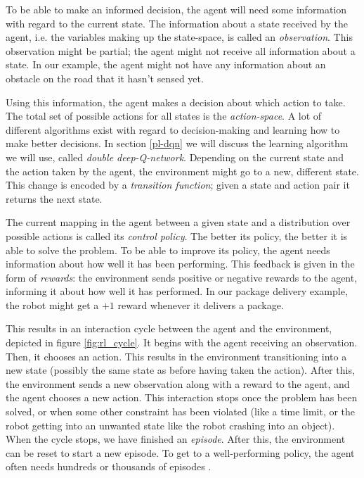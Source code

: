 To be able to make an informed decision, the agent will need some information with regard to the current state. The information about a state received by the agent, i.e. the variables making up the state-space, is called an \emph{observation}. This observation might be partial; the agent might not receive all information about a state. In our example, the agent might not have any information about an obstacle on the road that it hasn't sensed yet.

Using this information, the agent makes a decision  about which action to take. The total set of possible actions for all states is the \emph{action-space}. A lot of different algorithms exist with regard to decision-making and learning how to make better decisions. In section \ref{pl-dqn} we will discuss the learning algorithm we will use, called \emph{double deep-Q-network}. Depending on the current state and the action taken by the agent, the environment might go to a new, different state. This change is encoded by a \emph{transition function}; given a state and action pair it returns the next state. 

The current mapping in the agent between a given state and a distribution over possible actions is called its \emph{control policy}. The better its policy, the better it is able to solve the problem. To be able to improve its policy, the agent needs information about how well it has been performing. This feedback is given in the form of \emph{rewards}: the environment sends positive or negative rewards to the agent, informing it about how well it has performed. In our package delivery example, the robot might get a $+1$ reward whenever it delivers a package.

This results in an interaction cycle between the agent and the environment, depicted in figure \ref{fig:rl_cycle}. It begins with the agent receiving an observation. Then, it chooses an action. This results in the environment transitioning into a new state (possibly the same state as before having taken the action). After this, the environment sends a new observation along with a reward to the agent, and the agent chooses a new action. This interaction stops once the problem has been solved, or when some other constraint has been violated (like a time limit, or the robot getting into an unwanted state like the robot crashing into an object). When the cycle stops, we have finished an \emph{episode}. After this, the environment can be reset to start a new episode. To get to a well-performing policy, the agent often needs hundreds or thousands of episodes \cite[p. 6-10]{grokking}. 

